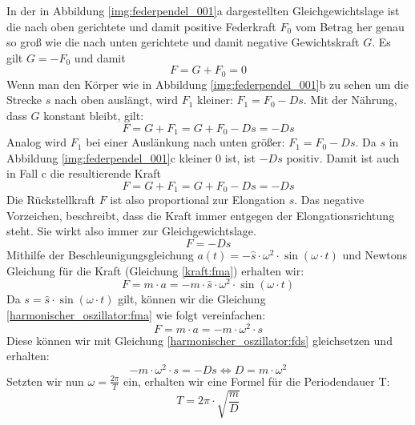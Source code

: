 \documentclass[a4paper]{article}
\begin{document}
	
			In der in Abbildung \ref{img:federpendel_001}a dargestellten Gleichgewichtslage ist die nach oben gerichtete und damit positive Federkraft $F_0$ vom Betrag her genau so groß wie die nach unten gerichtete und damit negative Gewichtskraft $G$. Es gilt $G=-F_0$ und damit
			\begin{equation}
				F=G+F_0=0
			\end{equation}
			Wenn man den Körper wie in Abbildung \ref{img:federpendel_001}b zu sehen um die Strecke $s$ nach oben auslängt, wird $F_1$ kleiner: $F_1 = F_0-Ds$. Mit der Nährung, dass $G$ konstant bleibt, gilt:
			\begin{equation}
				F=G+F_1= G+F_0-Ds = -Ds
			\end{equation}
			Analog wird $F_1$ bei einer Auslänkung nach unten größer: $F_1 = F_0-Ds$. Da $s$ in Abbildung \ref{img:federpendel_001}c kleiner $0$ ist, ist $-Ds$ positiv. Damit ist auch in Fall c die resultierende Kraft
			\begin{equation}\label{harmonischer_oszillator:fds}
			F=G+F_1= G+F_0-Ds = -Ds
			\end{equation}
			Die Rückstellkraft $F$ ist also proportional zur Elongation $s$. Das negative Vorzeichen, beschreibt, dass die Kraft immer entgegen der Elongationsrichtung steht. Sie wirkt also immer zur Gleichgewichtslage.
			\begin{equation}
				F= -Ds
			\end{equation}
			Mithilfe der Beschleunigungsgleichung $a(t)=-\hat{s}\cdot\omega^2\cdot\sin\left(\omega\cdot t\right)$ und Newtons Gleichung für die Kraft (Gleichung \ref{kraft:fma}) erhalten wir:
			\begin{equation}\label{harmonischer_oszillator:fma}
				F= m\cdot a = -m\cdot \hat{s}\cdot\omega^2\cdot\sin\left(\omega\cdot t\right)
			\end{equation}
			Da $s=\hat{s} \cdot\sin(\omega\cdot t)$ gilt, können wir die Gleichung \ref{harmonischer_oszillator:fma} wie folgt vereinfachen:
			\begin{equation}
				F= m\cdot a = -m\cdot\omega^2\cdot s
			\end{equation}
			Diese können wir mit Gleichung \ref{harmonischer_oszillator:fds} gleichsetzen und erhalten:
			\begin{equation}
				-m\cdot\omega^2\cdot s = -Ds \Leftrightarrow D=m\cdot\omega^2
			\end{equation}
			Setzten wir nun $\omega=\frac{2\pi}{T}$ ein, erhalten wir eine Formel für die Periodendauer T:
			\begin{equation}
				T=2\pi\cdot\sqrt{\frac{m}{D}}
			\end{equation}
	
\end{document}
